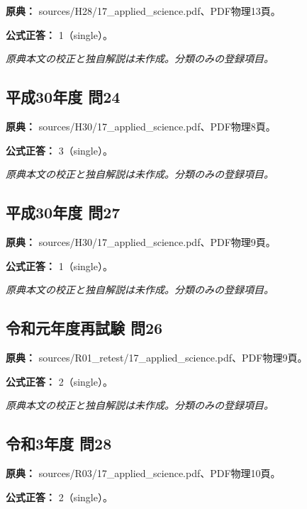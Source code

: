 \noindent\textbf{原典：} sources/H28/17\_applied\_science.pdf、PDF物理13頁。

\textbf{公式正答：} 1（single）。

\par\textit{原典本文の校正と独自解説は未作成。分類のみの登録項目。}

\subsection{平成30年度 問24}
\label{q:h30-reg-applied-24}

\noindent\textbf{原典：} sources/H30/17\_applied\_science.pdf、PDF物理8頁。

\textbf{公式正答：} 3（single）。

\par\textit{原典本文の校正と独自解説は未作成。分類のみの登録項目。}

\subsection{平成30年度 問27}
\label{q:h30-reg-applied-27}

\noindent\textbf{原典：} sources/H30/17\_applied\_science.pdf、PDF物理9頁。

\textbf{公式正答：} 1（single）。

\par\textit{原典本文の校正と独自解説は未作成。分類のみの登録項目。}

\subsection{令和元年度再試験 問26}
\label{q:r01-ret-applied-26}

\noindent\textbf{原典：} sources/R01\_retest/17\_applied\_science.pdf、PDF物理9頁。

\textbf{公式正答：} 2（single）。

\par\textit{原典本文の校正と独自解説は未作成。分類のみの登録項目。}

\subsection{令和3年度 問28}
\label{q:r03-reg-applied-28}

\noindent\textbf{原典：} sources/R03/17\_applied\_science.pdf、PDF物理10頁。

\textbf{公式正答：} 2（single）。

